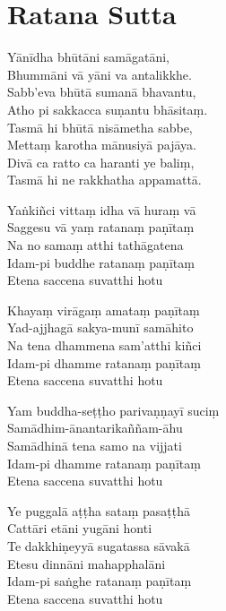 \section{Ratana Sutta}


\begin{paritta}

Yānīdha bhūtāni samāgatāni,\\
Bhummāni vā yāni va antalikkhe.\\
Sabb'eva bhūtā sumanā bhavantu,\\
Atho pi sakkacca suṇantu bhāsitaṃ.\\
Tasmā hi bhūtā nisāmetha sabbe,\\
Mettaṃ karotha mānusiyā pajāya.\\
Divā ca ratto ca haranti ye baliṃ,\\
Tasmā hi ne rakkhatha appamattā.

%
Yaṅkiñci vittaṃ idha vā huraṃ vā\\
Saggesu vā yaṃ ratanaṃ paṇītaṃ\\
Na no samaṃ atthi tathāgatena\\
Idam-pi buddhe ratanaṃ paṇītaṃ\\
Etena saccena suvatthi hotu

\clearpage

%
Khayaṃ virāgaṃ amataṃ paṇītaṃ\\
Yad-ajjhagā sakya-munī samāhito\\
Na tena dhammena sam'atthi kiñci\\
Idam-pi dhamme ratanaṃ paṇītaṃ\\
Etena saccena suvatthi hotu

%
Yam buddha-seṭṭho parivaṇṇayī suciṃ\\
Samādhim-ānantarikaññam-āhu\\
Samādhinā tena samo na vijjati\\
Idam-pi dhamme ratanaṃ paṇītaṃ\\
Etena saccena suvatthi hotu

%
Ye puggalā aṭṭha sataṃ pasaṭṭhā\\
Cattāri etāni yugāni honti\\
Te dakkhiṇeyyā sugatassa sāvakā\\
Etesu dinnāni mahapphalāni\\
Idam-pi saṅghe ratanaṃ paṇītaṃ\\
Etena saccena suvatthi hotu


\end{paritta}
